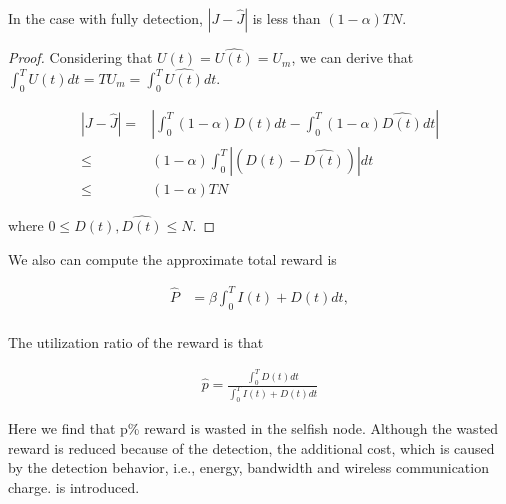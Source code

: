 \begin{lem}
In the case with fully detection,
$|J - \hat{J}|$ is less than $(1-\alpha) T N$.
\end{lem}
\begin{proof}
Considering that $U(t)= \hat{U(t)} = U_{m}$,
we can derive that $\int_{0}^{T} U(t) dt = T U_{m}
= \int_{0}^{T} \hat{U(t)} dt $.
\begin{small}
\begin{equation}
\label{eq:delta_J}
\begin{aligned}
|J - \hat{J}| = & | \int_{0}^{T} (1-\alpha)D(t) dt - \int_{0}^{T} (1-\alpha) \hat{D(t)} dt | \\
\le & (1-\alpha) \int_{0}^{T} |(D(t)-\hat{D(t)})| dt \\
\le & (1-\alpha) T N
\end{aligned}
\end{equation}
\end{small}
where $0 \le D(t), \hat{D(t)} \le N$.

\end{proof}

We also can compute the approximate total reward is
\begin{small}
\begin{equation}
\nonumber
\begin{aligned}
\hat{P} &= \beta \int_{0}^{T} I(t) + D(t) dt, \\
\end{aligned}
\end{equation}
\end{small}

The utilization ratio of the reward is that
\begin{small}
\begin{equation}
\nonumber
\begin{aligned}
\hat{p} = \frac{\int_{0}^{T} D(t) dt}{\int_{0}^{T} I(t) + D(t) dt}
\end{aligned}
\end{equation}
\end{small}

Here we find that p\% reward is wasted in the selfish node.
Although the wasted reward is reduced because of the detection,
the additional cost,
which is caused by the detection behavior,
i.e., energy, bandwidth and wireless communication charge.
is introduced.

